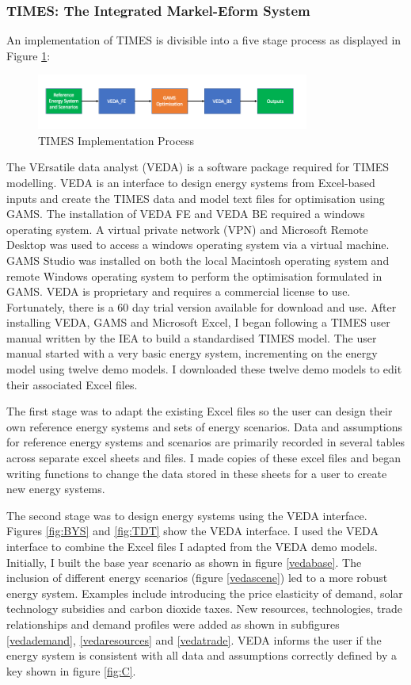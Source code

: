 \documentclass[12pt]{article}
\begin{document}
\subsubsection{TIMES: The Integrated Markel-Eform System}
An implementation of TIMES is divisible into a five stage process as displayed in Figure \ref{fig:times}:
\begin{figure}[H]
    \centering
	\includegraphics[width=0.8\textwidth]{TIMES.png}
	\caption{TIMES Implementation Process}
	\label{fig:times}
\end{figure}

The VErsatile data analyst (VEDA) \cite{VEDA} is a software package required for TIMES modelling. 
VEDA is an interface to design energy systems from Excel-based inputs and create the TIMES data and model text files for optimisation using GAMS.
The installation of VEDA FE and VEDA BE required a windows operating system. A virtual private network (VPN)
and Microsoft Remote Desktop was used to access a windows operating system via a virtual machine. GAMS Studio was installed on both 
the local Macintosh operating system and remote Windows operating system to perform the optimisation formulated in GAMS.
VEDA is proprietary and requires a commercial license to use. 
Fortunately, there is a 60 day trial version available for download and use.
After installing VEDA, GAMS and Microsoft Excel, I began following a TIMES user manual written by the IEA to build a standardised TIMES model.
The user manual started with a very basic energy system, incrementing on the energy model using twelve demo models.
I downloaded these twelve demo models to edit their associated Excel files.

The first stage was to adapt the existing Excel files so the user can design their own reference energy systems and sets of energy scenarios. 
Data and assumptions for reference energy systems and scenarios are primarily recorded in several tables across separate excel sheets and files.
I made copies of these excel files and began writing functions to change the data stored in these sheets for a user to create new energy systems.

The second stage was to design energy systems using the VEDA interface. Figures \ref{fig:BYS} and \ref{fig:TDT} show the VEDA interface. 
I used the VEDA interface to combine the Excel files I adapted from the VEDA demo models.
Initially, I built the base year scenario as shown in figure \ref{vedabase}. 
The inclusion of different energy scenarios (figure \ref{vedascene}) led to a more robust energy system.
Examples include introducing the price elasticity of demand, solar technology subsidies and carbon dioxide taxes.
New resources, technologies, trade relationships and demand profiles were added as shown in subfigures \ref{vedademand}, \ref{vedaresources} and \ref{vedatrade}.
VEDA informs the user if the energy system is consistent with all data and assumptions correctly defined by a key shown in figure \ref{fig:C}.
\end{document}
